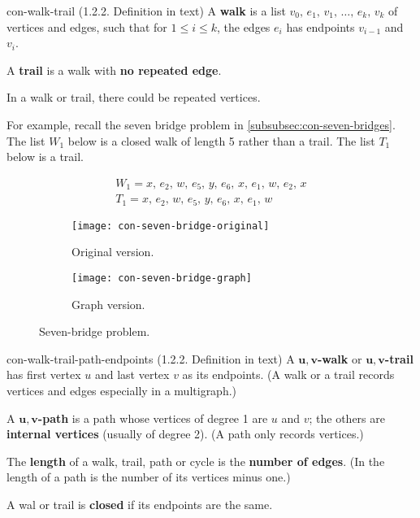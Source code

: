 \documentclass[../src/handouts/main.tex]{subfiles}
\begin{document}
\begin{definition}{}{con-walk-trail}
  (1.2.2. Definition in text)
  A \textbf{walk} is a list $v_0,\, e_1,\, v_1,\, \ldots,\, e_k,\, v_k$ of vertices and edges, such that for $1 \leq i \leq k$, the edges $e_i$ has endpoints $v_{i-1}$ and $v_i$.

  A \textbf{trail} is a walk with \textbf{no repeated edge}.
\end{definition}

In a walk or trail, there could be repeated vertices.

For example, recall the seven bridge problem in \cref{subsubsec:con-seven-bridges}. The list $W_1$ below is a closed walk of length 5 rather than a trail. The list $T_1$ below is a trail.

\begin{align*}
  W_1 = x,\, e_2,\, w,\, e_5,\, y,\, e_6,\, x,\, e_1,\, w,\, e_2,\, x \\
  T_1 = x,\, e_2,\, w,\, e_5,\, y,\, e_6,\, x,\, e_1,\, w
\end{align*}

\begin{figure}[htbp]
  \centering
  \begin{subfigure}{0.35\textwidth}
    \centering
    \texttt{[image: con-seven-bridge-original]}
    \caption{Original version.}
  \end{subfigure}
  \hfil
  \begin{subfigure}{0.25\textwidth}
    \centering
    \texttt{[image: con-seven-bridge-graph]}
    \caption{Graph version.}
  \end{subfigure}
  \caption{Seven-bridge problem.}
\end{figure}

\begin{definition}{}{con-walk-trail-path-endpoints}
  (1.2.2. Definition in text)
  A \textbf{$\bm{u,v}$-walk} or \textbf{$\bm{u,v}$-trail} has first vertex $u$ and last vertex $v$ as its endpoints.
  (A walk or a trail records vertices and edges especially in a multigraph.)

  A \textbf{$\bm{u,v}$-path} is a path whose vertices of degree 1 are $u$ and $v$; the others are \textbf{internal vertices} (usually of degree 2). (A path only records vertices.)

  The \textbf{length} of a walk, trail, path or cycle is the \textbf{number of edges}. (In the length of a path is the number of its vertices minus one.)

  A wal or trail is \textbf{closed} if its endpoints are the same.
\end{definition}
\end{document}
